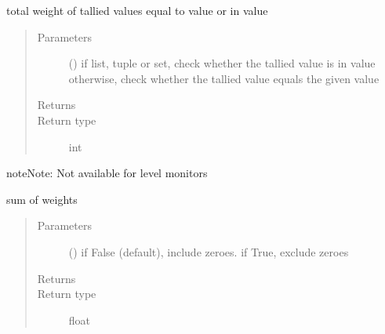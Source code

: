 \documentclass[letterpaper,10pt,english]{sphinxmanual}
\begin{document}
\begin{fulllineitems}
\begin{fulllineitems}
\label{\detokenize{Reference:salabim.Monitor.value_weight}}
total weight of tallied values equal to value or in value
\begin{quote}\begin{description}
\item[{Parameters}] \leavevmode
{} () \textendash{} if list, tuple or set, check whether the tallied value is in value 
otherwise, check whether the tallied value equals the given value

\item[{Returns}] \leavevmode
{}

\item[{Return type}] \leavevmode
int

\end{description}\end{quote}

\begin{sphinxadmonition}{note}{Note:}
Not available for level monitors
\end{sphinxadmonition}

\end{fulllineitems}


\begin{fulllineitems}
\label{\detokenize{Reference:salabim.Monitor.weight}}
sum of weights
\begin{quote}\begin{description}
\item[{Parameters}] \leavevmode
{} () \textendash{} if False (default), include zeroes. if True, exclude zeroes

\item[{Returns}] \leavevmode
{}

\item[{Return type}] \leavevmode
float

\end{description}\end{quote}


\end{fulllineitems}
\end{fulllineitems}
\end{document}
